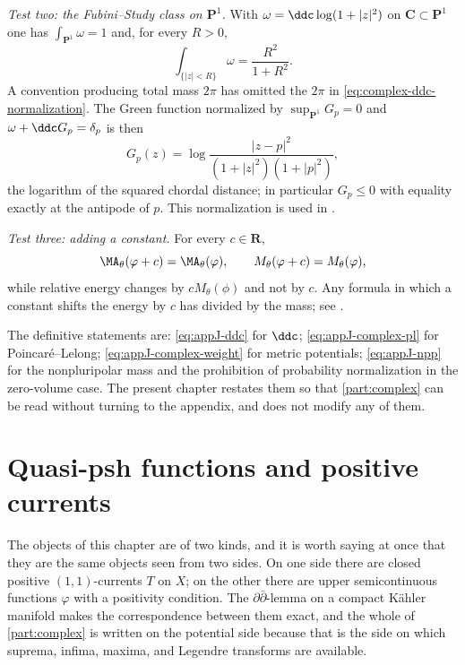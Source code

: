 \emph{Test two: the Fubini--Study class on \(\mathbf P^1\).}  With
\(\omega=\ddc\log(1+|z|^2)\) on \(\mathbf C\subset\mathbf P^1\) one has
\(\int_{\mathbf P^1}\omega=1\) and, for every \(R>0\),
\[
 \int_{\{|z|<R\}}\omega=\frac{R^2}{1+R^2}.
\]
A convention producing total mass \(2\pi\) has omitted the \(2\pi\) in
\eqref{eq:complex-ddc-normalization}.  The Green function normalized by
\(\sup_{\mathbf P^1}G_p=0\) and \(\omega+\ddc G_p=\delta_p\) is then
\[
 G_p(z)=\log\frac{|z-p|^2}{(1+|z|^2)(1+|p|^2)},
\]
the logarithm of the squared chordal distance; in particular \(G_p\leq0\)
with equality exactly at the antipode of \(p\).  This normalization is used
in .

\emph{Test three: adding a constant.}  For every \(c\in\mathbf R\),
\[
 \MA_\theta(\varphi+c)=\MA_\theta(\varphi),
 \qquad
 M_\theta(\varphi+c)=M_\theta(\varphi),
\]
while relative energy changes by \(cM_\theta(\phi)\) and not by \(c\).  Any
formula in which a constant shifts the energy by \(c\) has divided by the
mass; see .

\begin{remark}
\label{rem:ch51-convention-map}
The definitive statements are:
\eqref{eq:appJ-ddc} for \(\ddc\);
\eqref{eq:appJ-complex-pl} for Poincar\'e--Lelong;
\eqref{eq:appJ-complex-weight} for metric potentials;
\eqref{eq:appJ-npp} for the nonpluripolar mass and the prohibition of
probability normalization in the zero-volume case.  The present chapter
restates them so that \cref{part:complex} can be read without turning to
the appendix, and does not modify any of them.
\end{remark}

\section{Quasi-psh functions and positive currents}
\label{sec:ch51-qpsh}

The objects of this chapter are of two kinds, and it is worth saying at
once that they are the same objects seen from two sides.  On one side
there are closed positive \((1,1)\)-currents \(T\) on \(X\); on the other
there are upper semicontinuous functions \(\varphi\) with a positivity
condition.  The \(\partial\bar\partial\)-lemma on a compact K\"ahler
manifold makes the correspondence between them exact, and the whole of
\cref{part:complex} is written on the potential side because that is the
side on which suprema, infima, maxima, and Legendre transforms are
available.

